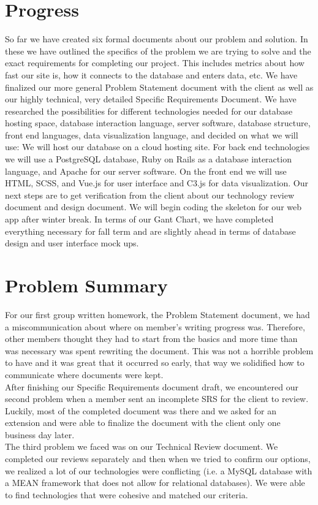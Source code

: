 \documentclass[draftclsnofoot,onecolumn,letterpaper,10pt,compsoc]{IEEEtran}
\begin{document}
\section{Progress}
So far we have created six formal documents about our problem and solution. In these we have outlined the specifics of the problem we are trying to solve and the exact requirements for completing our project. This includes metrics about how fast our site is, how it connects to the database and enters data, etc. We have finalized our more general Problem Statement document with the client as well as our highly technical, very detailed Specific Requirements Document. We have researched the possibilities for different technologies needed for our database hosting space, database interaction language, server software, database structure, front end languages, data visualization language, and decided on what we will use:
We will host our database on a cloud hosting site. For back end technologies we will use a PostgreSQL database, Ruby on Rails as a database interaction language, and Apache for our server software. On the front end we will use HTML, SCSS, and Vue.js for user interface and C3.js for data visualization.
Our next steps are to get verification from the client about our technology review document and design document. We will begin coding the skeleton for our web app after winter break.
In terms of our Gant Chart, we have completed everything necessary for fall term and are slightly ahead in terms of database design and user interface mock ups.

\section{Problem Summary}
For our first group written homework, the Problem Statement document, we had a miscommunication about where on member’s writing progress was.
Therefore, other members thought they had to start from the basics and more time than was necessary was spent rewriting the document.
This was not a horrible problem to have and it was great that it occurred so early, that way we solidified how to communicate where documents were kept. \\
After finishing our Specific Requirements document draft, we encountered our second problem when a member sent an incomplete SRS for the client to review.
Luckily, most of the completed document was there and we asked for an extension and were able to finalize the document with the client only one business day later.\\
The third problem we faced was on our Technical Review document.
We completed our reviews separately and then when we tried to confirm our options, we realized a lot of our technologies were conflicting (i.e. a MySQL database with a MEAN framework that does not allow for relational databases).
We were able to find technologies that were cohesive and matched our criteria.
\end{document}
